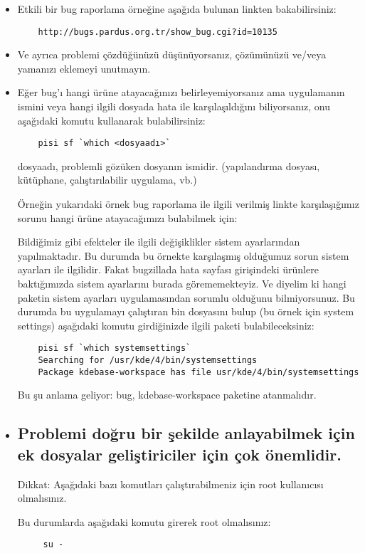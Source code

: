 \documentclass[a4paper,10pt]{article}
\begin{document}
\begin{itemize}
	\item Etkili bir bug raporlama örneğine aşağıda bulunan linkten bakabilirsiniz:
	\begin{verbatim}
	http://bugs.pardus.org.tr/show_bug.cgi?id=10135
	\end{verbatim}
	\item Ve ayrıca problemi çözdüğünüzü düşünüyorsanız, çözümünüzü ve/veya yamanızı eklemeyi unutmayın.

  	\item Eğer bug'ı hangi ürüne atayacağınızı belirleyemiyorsanız ama uygulamanın ismini veya hangi ilgili dosyada hata ile karşılaşıldığını biliyorsanız, onu aşağıdaki komutu kullanarak bulabilirsiniz:
	\begin{verbatim}
	pisi sf `which <dosyaadı>`
	\end{verbatim}
	dosyaadı, problemli gözüken dosyanın ismidir. (yapılandırma dosyası, kütüphane, çalıştırılabilir uygulama, vb.)

	Örneğin yukarıdaki örnek bug raporlama ile ilgili verilmiş linkte karşılaşığımız sorunu hangi ürüne atayacağımızı bulabilmek için:

	Bildiğimiz gibi efekteler ile ilgili değişiklikler sistem ayarlarından yapılmaktadır. Bu durumda bu örnekte karşılaşmış olduğumuz sorun sistem ayarları ile ilgilidir. Fakat bugzillada hata sayfası girişindeki ürünlere baktığımızda sistem ayarlarını burada  görememekteyiz. Ve diyelim ki hangi paketin sistem ayarları uygulamasından sorumlu olduğunu bilmiyorsunuz. Bu durumda bu uygulamayı çalıştıran bin dosyasını bulup (bu örnek için system settings) aşağıdaki komutu girdiğinizde ilgili paketi bulabileceksiniz:
	\begin{verbatim}
	pisi sf `which systemsettings`
	Searching for /usr/kde/4/bin/systemsettings
	Package kdebase-workspace has file usr/kde/4/bin/systemsettings
	\end{verbatim}
	Bu şu anlama geliyor: bug, kdebase-workspace paketine atanmalıdır.

  \item \subsection*{Problemi doğru bir şekilde anlayabilmek için ek dosyalar geliştiriciler için çok önemlidir.}

	Dikkat: Aşağıdaki bazı komutları çalıştırabilmeniz için root kullanıcısı olmalısınız. 

	Bu durumlarda aşağıdaki komutu girerek root olmalısınız:
	\begin{verbatim}
	 su -
	\end{verbatim}


\end{itemize}
\end{document}
